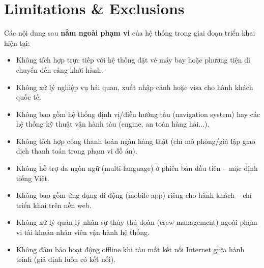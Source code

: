 \documentclass[a4paper,11pt]{article}
\begin{document}
\section{Limitations \& Exclusions}

Các nội dung sau \textbf{nằm ngoài phạm vi} của hệ thống trong giai đoạn triển khai hiện tại:

\begin{itemize}[leftmargin=1.2cm]
  \item Không tích hợp trực tiếp với hệ thống đặt vé máy bay hoặc phương tiện di chuyển đến cảng khởi hành.
  \item Không xử lý nghiệp vụ hải quan, xuất nhập cảnh hoặc visa cho hành khách quốc tế.
  \item Không bao gồm hệ thống định vị/điều hướng tàu (navigation system) hay các hệ thống kỹ thuật vận hành tàu (engine, an toàn hàng hải...).
  \item Không tích hợp cổng thanh toán ngân hàng thật (chỉ mô phỏng/giả lập giao dịch thanh toán trong phạm vi đồ án).
  \item Không hỗ trợ đa ngôn ngữ (multi-language) ở phiên bản đầu tiên -- mặc định tiếng Việt.
  \item Không bao gồm ứng dụng di động (mobile app) riêng cho hành khách -- chỉ triển khai trên nền web.
  \item Không xử lý quản lý nhân sự thủy thủ đoàn (crew management) ngoài phạm vi tài khoản nhân viên vận hành hệ thống.
  \item Không đảm bảo hoạt động offline khi tàu mất kết nối Internet giữa hành trình (giả định luôn có kết nối).
\end{itemize}
\end{document}
